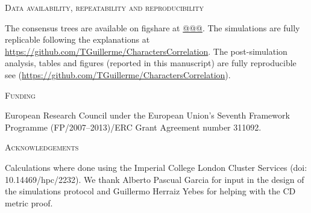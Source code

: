 \documentclass[12pt,letterpaper]{article}
\renewcommand{\section}[1]{%
\bigskip
\begin{center}
\begin{Large}
\normalfont\scshape #1
\medskip
\end{Large}
\end{center}}
\begin{document}
\section{Data availability, repeatability and reproducibility}
The consensus trees are available on figshare at \url{@@@}.
The simulations are fully replicable following the explanations at \url{https://github.com/TGuillerme/CharactersCorrelation}.
The post-simulation analysis, tables and figures (reported in this manuscript) are fully reproducible see (\url{https://github.com/TGuillerme/CharactersCorrelation}).

\section{Funding}
European Research Council under the European Union’s Seventh Framework Programme (FP/2007–2013)/ERC Grant Agreement number 311092.

\section{Acknowledgements}
Calculations where done using the Imperial College London Cluster Services (doi: 10.14469/hpc/2232).
We thank Alberto Pascual Garcia for input in the design of the simulations protocol and Guillermo Herraiz Yebes for helping with the CD metric proof.






\end{document}
